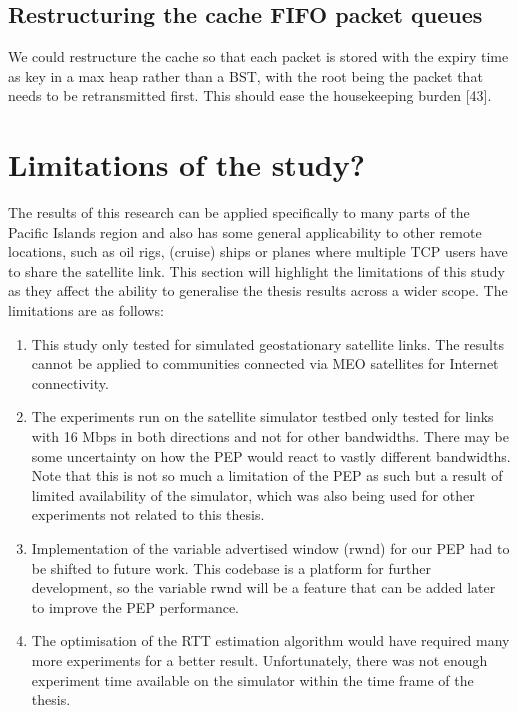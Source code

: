 \subsection{Restructuring the cache FIFO packet queues}
We could restructure the cache so that each packet is stored with the expiry time as key in a max heap rather than a BST, with the root being the packet that needs to be retransmitted first. This should ease the housekeeping burden [43].

\section{Limitations of the study?}

The results of this research can be applied specifically to many parts of the Pacific Islands region and also has some general applicability to other remote locations, such as oil rigs, (cruise) ships or planes where multiple TCP users have to share the satellite link. This section will highlight the limitations of this study as they affect the ability to generalise the thesis results across a wider scope. The limitations are as follows:

\begin{enumerate}
\item This study only tested for simulated geostationary satellite links.  The results cannot be applied to communities connected via MEO satellites for Internet connectivity. 
\item The experiments run on the satellite simulator testbed only tested for links with 16 Mbps in both directions and not for other bandwidths. There may be some uncertainty on how the PEP would react to vastly different bandwidths. Note that this is not so much a limitation of the PEP as such but a result of limited availability of the simulator, which was also being used for other experiments not related to this thesis.
\item Implementation of the variable advertised window (rwnd) for our PEP had to be shifted to future work. This codebase is a platform for further development, so the variable rwnd will be a feature that can be added later to improve the PEP performance. 
\item The optimisation of the RTT estimation algorithm would have required many more experiments for a better result. Unfortunately, there was not enough experiment time available on the simulator within the time frame of the thesis.
\end{enumerate}


